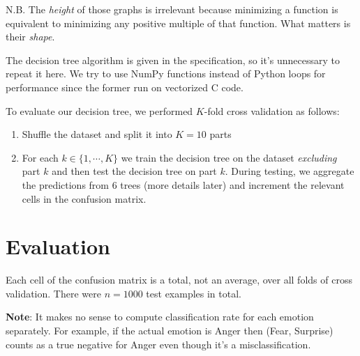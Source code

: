 \documentclass[12pt, a4paper]{article}
\begin{document}
N.B. The \textit{height} of those graphs is irrelevant because minimizing a function is equivalent to minimizing any positive multiple of that function. What matters is their \textit{shape}.\par
\bigskip
The decision tree algorithm is given in the specification, so it's unnecessary to repeat it here. We try to use NumPy functions instead of Python loops for performance since the former run on vectorized C code.\par
\bigskip
To evaluate our decision tree, we performed $K$-fold cross validation as follows:
\begin{enumerate}
    \item Shuffle the dataset and split it into $K = 10$ parts
    \item For each $k \in \{1, \dotsm, K\}$ we train the decision tree on the dataset \textit{excluding} part $k$ and then test the decision tree on part $k$. During testing, we aggregate the predictions from 6 trees (more details later) and increment the relevant cells in the confusion matrix.
\end{enumerate}

\section*{Evaluation}
Each cell of the confusion matrix is a total, not an average, over all folds of cross validation. There were $n = 1000$ test examples in total.\par
\bigskip
\textbf{Note}: It makes no sense to compute classification rate for each emotion separately. For example, if the actual emotion is Anger then (Fear, Surprise) counts as a true negative for Anger even though it's a misclassification.
\bigskip
\end{document}

